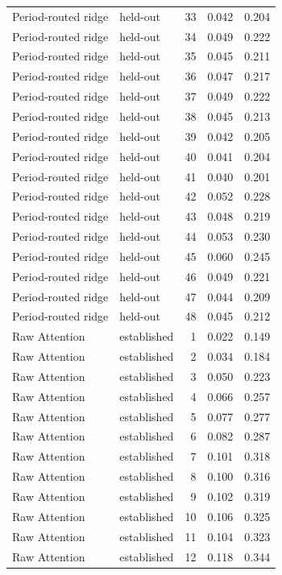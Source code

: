 \begin{tabular}{llrrr}
Period-routed ridge & held-out & 33 & 0.042 & 0.204 \\
Period-routed ridge & held-out & 34 & 0.049 & 0.222 \\
Period-routed ridge & held-out & 35 & 0.045 & 0.211 \\
Period-routed ridge & held-out & 36 & 0.047 & 0.217 \\
Period-routed ridge & held-out & 37 & 0.049 & 0.222 \\
Period-routed ridge & held-out & 38 & 0.045 & 0.213 \\
Period-routed ridge & held-out & 39 & 0.042 & 0.205 \\
Period-routed ridge & held-out & 40 & 0.041 & 0.204 \\
Period-routed ridge & held-out & 41 & 0.040 & 0.201 \\
Period-routed ridge & held-out & 42 & 0.052 & 0.228 \\
Period-routed ridge & held-out & 43 & 0.048 & 0.219 \\
Period-routed ridge & held-out & 44 & 0.053 & 0.230 \\
Period-routed ridge & held-out & 45 & 0.060 & 0.245 \\
Period-routed ridge & held-out & 46 & 0.049 & 0.221 \\
Period-routed ridge & held-out & 47 & 0.044 & 0.209 \\
Period-routed ridge & held-out & 48 & 0.045 & 0.212 \\
Raw Attention & established & 1 & 0.022 & 0.149 \\
Raw Attention & established & 2 & 0.034 & 0.184 \\
Raw Attention & established & 3 & 0.050 & 0.223 \\
Raw Attention & established & 4 & 0.066 & 0.257 \\
Raw Attention & established & 5 & 0.077 & 0.277 \\
Raw Attention & established & 6 & 0.082 & 0.287 \\
Raw Attention & established & 7 & 0.101 & 0.318 \\
Raw Attention & established & 8 & 0.100 & 0.316 \\
Raw Attention & established & 9 & 0.102 & 0.319 \\
Raw Attention & established & 10 & 0.106 & 0.325 \\
Raw Attention & established & 11 & 0.104 & 0.323 \\
Raw Attention & established & 12 & 0.118 & 0.344 \\

\end{tabular}
